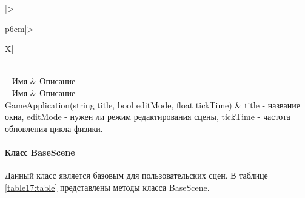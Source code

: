 \begin{xltabular}{\textwidth}{|>{\raggedright\arraybackslash}p{6cm}|>{\raggedright\arraybackslash}X|}
	\caption{Конструкторы класса GameApplication\label{table16:table}}\\ \hline
	~ \centrow Имя & \centrow Описание \\ \hline
	\endfirsthead
	~ \centrow Имя & \centrow Описание \\ \hline 
	\finishhead
	GameApplication(string title, bool editMode, float tickTime) & title - название окна, editMode - нужен ли режим редактирования сцены, tickTime - частота обновления цикла физики.
\end{xltabular}

\paragraph{Класс BaseScene}

Данный класс является базовым для пользовательских сцен. В таблице \ref{table17:table} представлены методы класса BaseScene.


